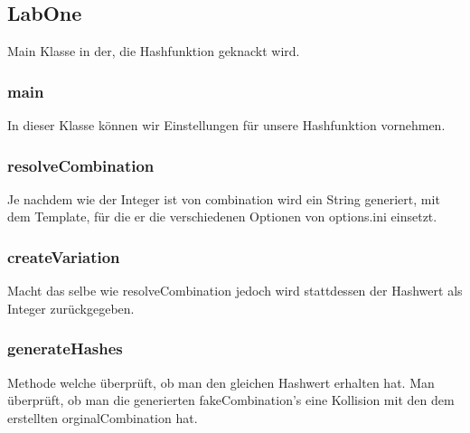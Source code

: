 \documentclass[12pt]{scrartcl}
\begin{document}
\subsection{LabOne}
Main Klasse in der, die Hashfunktion geknackt wird.
\subsubsection{main}
In dieser Klasse können wir Einstellungen für unsere Hashfunktion vornehmen.
\subsubsection{resolveCombination}
Je nachdem wie der Integer ist von combination wird ein String generiert, mit dem Template, für die er die verschiedenen Optionen von options.ini einsetzt.
\subsubsection{createVariation}
Macht das selbe wie resolveCombination jedoch wird stattdessen der Hashwert als Integer zurückgegeben.
\subsubsection{generateHashes}

Methode welche überprüft, ob man den gleichen Hashwert erhalten hat. Man überprüft, ob man die generierten fakeCombination's eine Kollision mit den dem erstellten orginalCombination hat.


 
 
\end{document}
